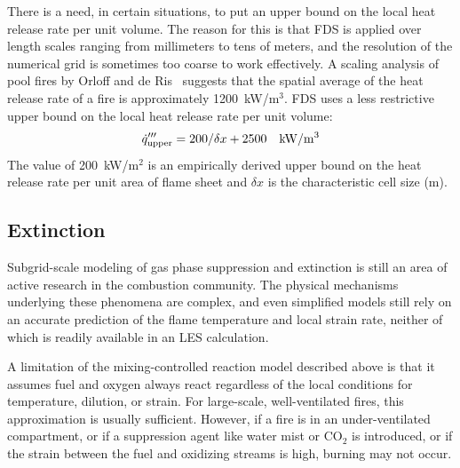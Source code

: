 There is a need, in certain situations, to put an upper bound on the local heat release rate per unit volume. The reason for
this is that FDS is applied over length scales ranging from millimeters to tens of meters, and the resolution of the numerical grid
is sometimes too coarse to work effectively.
A scaling analysis of pool fires by Orloff and de Ris~\cite{Orloff:19th_Symposium} suggests that the spatial average of the
heat release rate of a fire is approximately 1200~kW/m$^3$. FDS uses a less restrictive upper bound on the local heat release rate per unit volume:
\begin{equation}\label{eq:q_bound}
\dq_{\rm upper}''' = 200/\dx + 2500 \quad \si{kW/m^3}
\end{equation}
The value of 200~kW/m$^2$ is an empirically derived upper bound on the heat release rate per unit area of flame sheet and $\delta x$ is the characteristic cell size (m). 

%
%


\subsection{Extinction}

\label{extinction}

Subgrid-scale modeling of gas phase suppression and extinction is still an area of active research in the combustion community. The physical mechanisms underlying these phenomena are complex, and even simplified models still rely on an accurate prediction of the flame temperature and local strain rate, neither of which is readily available in an LES calculation.

A limitation of the mixing-controlled reaction model described above is that it assumes fuel and oxygen always react regardless of the local conditions for temperature, dilution, or strain. For large-scale, well-ventilated fires, this approximation is usually sufficient. However, if a fire is in an under-ventilated compartment, or if a suppression agent like water mist or CO$_2$ is introduced, or if the strain between the fuel and oxidizing streams is high, burning may not occur. 


